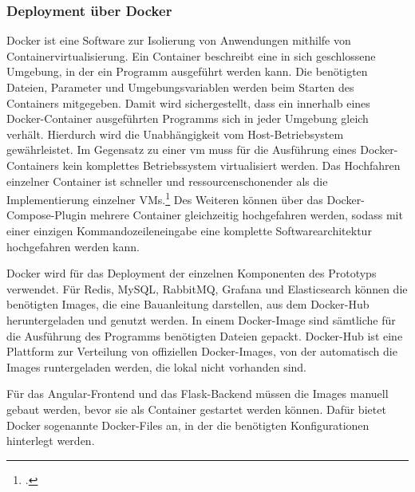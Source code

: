 \subsubsection{Deployment über Docker}
Docker ist eine Software zur Isolierung von Anwendungen mithilfe von Containervirtualisierung. Ein Container beschreibt eine in sich geschlossene Umgebung, in der ein Programm ausgeführt werden kann. Die benötigten Dateien, Parameter und Umgebungsvariablen werden beim Starten des Containers mitgegeben. Damit wird sichergestellt, dass ein innerhalb eines Docker-Container ausgeführten Programms sich in jeder Umgebung gleich verhält. Hierdurch wird die Unabhängigkeit vom Host-Betriebsystem gewährleistet. Im Gegensatz zu einer \ac{vm} muss für die Ausführung eines Docker-Containers kein komplettes Betriebssystem virtualisiert werden. Das Hochfahren einzelner Container ist schneller und ressourcenschonender als die Implementierung einzelner VMs.\footcite{anderson2015docker} Des Weiteren können über das Docker-Compose-Plugin mehrere Container gleichzeitig hochgefahren werden, sodass mit einer einzigen Kommandozeileneingabe eine komplette Softwarearchitektur hochgefahren werden kann.

Docker wird für das Deployment der einzelnen Komponenten des Prototyps verwendet. Für Redis, MySQL, RabbitMQ, Grafana und Elasticsearch können die benötigten Images, die eine Bauanleitung darstellen, aus dem Docker-Hub heruntergeladen und genutzt werden. In einem Docker-Image sind sämtliche für die Ausführung des Programms benötigten Dateien gepackt. Docker-Hub ist eine Plattform zur Verteilung von offiziellen Docker-Images, von der automatisch die Images runtergeladen werden, die lokal nicht vorhanden sind.

Für das Angular-Frontend und das Flask-Backend müssen die Images manuell gebaut werden, bevor sie als Container gestartet werden können. Dafür bietet Docker sogenannte Docker-Files an, in der die benötigten Konfigurationen hinterlegt werden.

